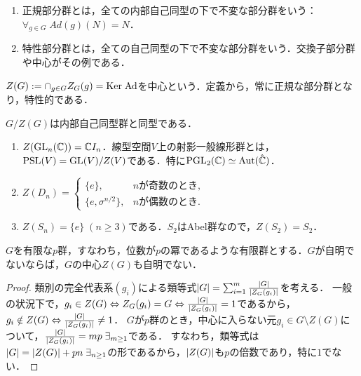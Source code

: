 \documentclass[uplatex,dvipdfmx]{jsreport}
\begin{document}
\begin{definition}\mbox{}
    \begin{enumerate}
        \item 正規部分群とは，全ての内部自己同型の下で不変な部分群をいう：$\forall_{g\in G}\;Ad(g)(N)=N$．
        \item 特性部分群とは，全ての自己同型の下で不変な部分群をいう．交換子部分群や中心がその例である．
    \end{enumerate}
    $Z(G):=\cap_{g\in G}Z_G(g)=\mathrm{Ker}\;\mathrm{Ad}$を中心という．定義から，常に正規な部分群となり，特性的である．
\end{definition}

\begin{lemma}\label{lemma-group-of-inner-isomorphism}
    $G/Z(G)$は内部自己同型群と同型である．
\end{lemma}

\begin{example}[中心]\label{exp-center}\mbox{}
    \begin{enumerate}
        \item $Z(\mathrm{GL}_n(\mathbb{C}))=\mathbb{C} I_n$．線型空間$V$上の射影一般線形群とは，$\mathrm{PSL}(V)=\mathrm{GL}(V)/Z(V)$である．特に$\mathrm{PGL}_2(\mathbb{C})\simeq\mathrm{Aut}(\hat{\mathbb{C}})$．
        \item $Z(D_n)=\begin{cases}
            \{e\},&nが奇数のとき,\\
            \{e,\sigma^{n/2}\},&nが偶数のとき.
        \end{cases}$
        \item $Z(S_n)=\{e\}\;(n\ge 3)$である．$S_2$はAbel群なので，$Z(S_2)=S_2$．
    \end{enumerate}
\end{example}

\begin{proposition}[$p$-群の中心は非自明である]\label{prop-zentrum-of-primary-group-is-trivial}
    $G$を有限な$p$群，すなわち，位数が$p$の冪であるような有限群とする．$G$が自明でないならば，$G$の中心$Z(G)$も自明でない．
\end{proposition}
\begin{proof}
    類別の完全代表系$(g_i)$による類等式$\lvert G\rvert=\sum^m_{i=1}\frac{\lvert G\rvert}{\lvert Z_G(g_i)\rvert}$を考える．
    一般の状況下で，$g_i\in Z(G)\Leftrightarrow Z_G(g_i)=G\Leftrightarrow\frac{\lvert G\rvert}{\lvert Z_G(g_i)\rvert}=1$であるから，$g_i\notin Z(G)\Leftrightarrow\frac{\lvert G\rvert}{\lvert Z_G(g_i)\rvert}\ne 1$．
    $G$が$p$群のとき，中心に入らない元$g_i\in G\setminus Z(G)$について，$\frac{\lvert G\rvert}{\lvert Z_G(g_i)\rvert}=mp\;\exists_{m\ge 1}$である．
    すなわち，類等式は$\lvert G\rvert=\lvert Z(G)\rvert+pn\;\exists_{n\ge 1}$の形であるから，$\lvert Z(G)\rvert$も$p$の倍数であり，特に$1$でない．
\end{proof}
\end{document}
